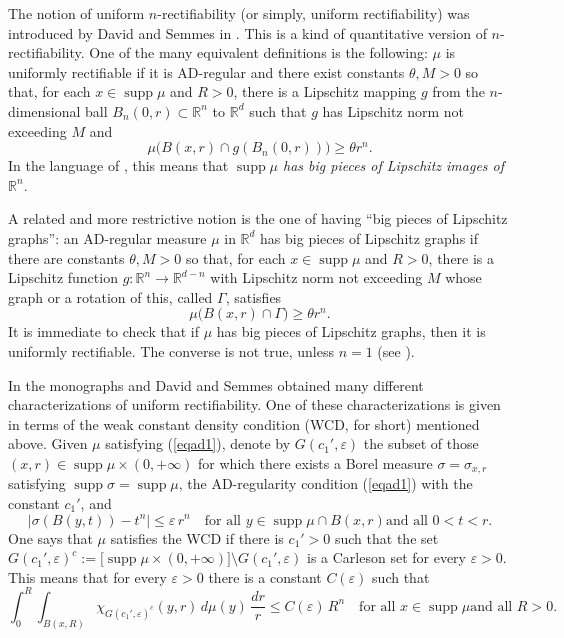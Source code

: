 \documentclass[11pt]{amsart}
\newcommand{\R}{{\mathbb R}}       %
\newcommand{\rf}[1]{{(\ref{#1})}}
\newcommand{\supp}{\operatorname{supp}}
\newcommand{\ve}{{\varepsilon}}
\theoremstyle{definition}
\theoremstyle{remark}
\numberwithin{equation}{section}
\begin{document}
The notion of uniform $n$-rectifiability (or simply, uniform rectifiability) was introduced by David 
and Semmes in \cite{DS}. This is a kind of quantitative version of $n$-rectifiability.
One of the many equivalent definitions is the following: $\mu$ is uniformly rectifiable if 
it is AD-regular and there exist constants $\theta,M>0$ so that, for
each $x\in\supp\mu$ and $R>0$, there is a Lipschitz mapping $g$ from the $n$-dimensional ball $B_n(0,r)\subset\R^n$
to $\R^d$ such that $g$ has Lipschitz norm not exceeding $M$ and
$$\mu\bigl(B(x,r)\cap g(B_n(0,r))\bigr) \geq \theta r^n.$$
In the language of \cite{DS}, this means that {\em $\supp\mu$ has big pieces of Lipschitz images of $\R^n$}.

A related and more restrictive  notion is the one of having ``big pieces of Lipschitz graphs'': an  AD-regular measure $\mu$ in
$\R^d$ has big pieces of Lipschitz graphs if there are constants $\theta,M>0$ so that, for
each $x\in\supp\mu$ and $R>0$, there is a Lipschitz function $g:\R^n\to\R^{d-n}$
with Lipschitz norm not exceeding $M$ whose graph or a rotation of this, called $\Gamma$, satisfies
$$\mu\bigl(B(x,r)\cap \Gamma\bigr) \geq \theta r^n.$$
It is immediate to check that if $\mu$ has big pieces of Lipschitz graphs, then
it is uniformly rectifiable. The converse is not true, unless $n=1$ (see \cite[Chapter I.1]{DS}).

In the monographs \cite{DS1} and \cite{DS} David and Semmes obtained many different characterizations of
uniform rectifiability. One of these characterizations is given in terms of the weak constant density condition (WCD, for short) mentioned above. Given $\mu$ satisfying \rf{eqad1}, denote by $G(c_1',\ve
)$ the subset of
those $(x,r)\in \supp\mu\times (0,+\infty)$ for which there exists a Borel measure $\sigma=\sigma_{x,r}$ satisfying
$\supp\sigma=\supp\mu$, the AD-regularity condition \rf{eqad1} with the constant $c_1'$, and
$$\bigl|\sigma(B(y,t)) - t^n\bigr|\leq\ve \,r^n\quad\mbox{for all $y\in\supp\mu\cap B(x,r)$
and all $0<t<r$.}$$
One says that $\mu$ satisfies the WCD if there is $c_1'>0$ such that the set $ G(c_1',\ve)^c :=
\bigl[\supp\mu\times (0,+\infty)\bigr]\setminus G(c_1',\ve)$ is a Carleson set for every 
$\ve>0$. This means that for every $\ve>0$ there is a constant $C(\ve)$  such that
$$\int_0^R\int_{B(x,R)}\chi_{G(c_1',\ve)^c}(y,r)\,d\mu(y)\,\frac{dr}r \leq C(\ve)\,R^n
\quad\mbox{for all $x\in\supp\mu$
and all $R>0$.}$$
 
\end{document}
